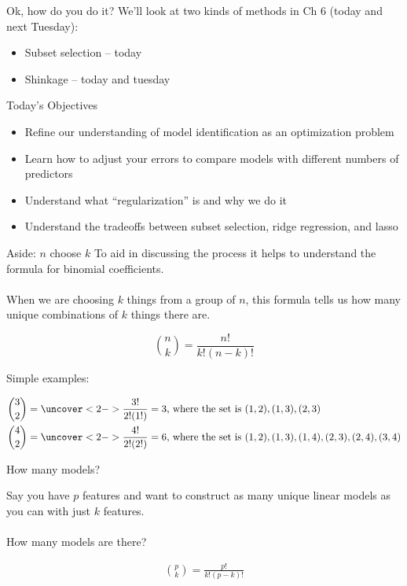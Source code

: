 \documentclass[mathserif, aspectratio=169]{beamer}
\begin{document}
\begin{frame}{Ok, how do you do it?}
We'll look at two kinds of methods in Ch 6 (today and next Tuesday):
\begin{itemize}
\item Subset selection -- today
\item Shinkage -- today and tuesday
\end{itemize}

{\large \color{blue} Today's Objectives}
\begin{itemize}
\item Refine our understanding of model identification as an optimization problem
\item Learn how to adjust your errors to compare models with different numbers of predictors
\item Understand what ``regularization'' is and why we do it
\item Understand the tradeoffs between subset selection, ridge regression, and lasso
\end{itemize}


\end{frame}

\begin{frame}{Aside: $n$ choose $k$}
To aid in discussing the process it helps to understand the formula for binomial coefficients.\\~\\

When we are choosing $k$ things from a group of $n$, this formula tells us how many unique combinations of $k$ things there are.

\begin{equation}
{{n}\choose{k}} = \frac{n!}{k!(n-k)!}
\end{equation}

Simple examples:  

\begin{align*}
{{3}\choose{2}} &= \uncover<2->{\frac{3!}{2!(1!)} = 3\text{, where the set is } {(1,2), (1,3), (2,3)}}\\
{{4}\choose{2}} &= \uncover<2->{\frac{4!}{2!(2!)} = 6\text{, where the set is } {(1,2), (1,3), (1,4), (2,3), (2,4), (3,4)}}
\end{align*}
\end{frame}

\begin{frame}{How many models?}

Say you have $p$ features and want to construct as many unique linear models as you can with just $k$ features.  \\~\\

How many models are there?\\

\pause

\begin{align*}
{p\choose{k}} = \frac{p!}{k!(p-k)!}
\end{align*}

\end{frame}
\end{document}

